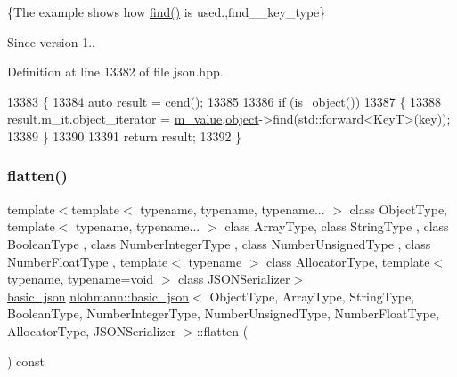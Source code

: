 \{The example shows how {\ttfamily \hyperlink{classnlohmann_1_1basic__json_a89eb3928f57903677051c80534be9cb1}{find()}} is used.,find\+\_\+\+\_\+key\+\_\+type\}

\begin{DoxySince}{Since}
version 1.. 
\end{DoxySince}


Definition at line 13382 of file json.\+hpp.


\begin{DoxyCode}
13383     \{
13384         \textcolor{keyword}{auto} result = \hyperlink{classnlohmann_1_1basic__json_a8dba7b7d2f38e6b0c614030aa43983f6}{cend}();
13385 
13386         \textcolor{keywordflow}{if} (\hyperlink{classnlohmann_1_1basic__json_af8f511af124e82e4579f444b4175787c}{is\_object}())
13387         \{
13388             result.m\_it.object\_iterator = \hyperlink{classnlohmann_1_1basic__json_aeb0814f76966f99290cb29e127c90a77}{m\_value}.\hyperlink{unionnlohmann_1_1basic__json_1_1json__value_a4a2209bb26e7088cd36bf24824ab5521}{object}->find(std::forward<KeyT>(key));
13389         \}
13390 
13391         \textcolor{keywordflow}{return} result;
13392     \}
\end{DoxyCode}
\mbox{\label{classnlohmann_1_1basic__json_ab838f000d76662917ffd6ec529569e03}} 
\subsubsection{\texorpdfstring{flatten()}{flatten()}}
{\footnotesize\ttfamily template$<$template$<$ typename, typename, typename... $>$ class Object\+Type, template$<$ typename, typename... $>$ class Array\+Type, class String\+Type , class Boolean\+Type , class Number\+Integer\+Type , class Number\+Unsigned\+Type , class Number\+Float\+Type , template$<$ typename $>$ class Allocator\+Type, template$<$ typename, typename=void $>$ class J\+S\+O\+N\+Serializer$>$ \\
\hyperlink{classnlohmann_1_1basic__json}{basic\+\_\+json} \hyperlink{classnlohmann_1_1basic__json}{nlohmann\+::basic\+\_\+json}$<$ Object\+Type, Array\+Type, String\+Type, Boolean\+Type, Number\+Integer\+Type, Number\+Unsigned\+Type, Number\+Float\+Type, Allocator\+Type, J\+S\+O\+N\+Serializer $>$\+::flatten (\begin{DoxyParamCaption}{ }\end{DoxyParamCaption}) const\hspace{0.3cm}{\ttfamily [inline]}}



